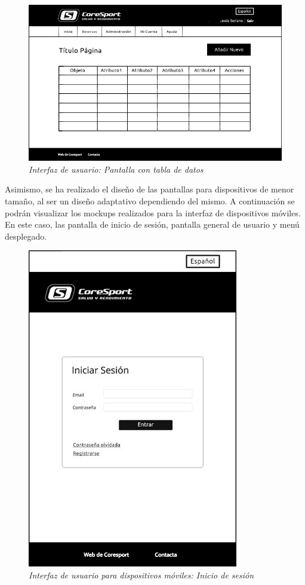 \begin{figure}
\centering
  \includegraphics[scale=.40]{img/interfaz/cuadro-general.jpg}
  \caption{\textit{Interfaz de usuario: Pantalla con tabla de datos}}
  \label{fig:interfaz-cuadro-general}
\end{figure}


Asimismo, se ha realizado el diseño de las pantallas para dispositivos de menor tamaño, al ser un diseño adaptativo dependiendo del mismo. A continuación se podrán visualizar los mockups realizados para la interfaz de dispositivos móviles. En este caso, las pantalla de inicio de sesión, pantalla general de usuario y menú desplegado.


\begin{figure}[H]
\centering
  \includegraphics[scale=.50]{img/interfaz/inicio-sesion-movil.jpg}
  \caption{\textit{Interfaz de usuario para dispositivos móviles: Inicio de sesión}}
  \label{fig:interfaz-inicio-sesion-movil}
\end{figure}

